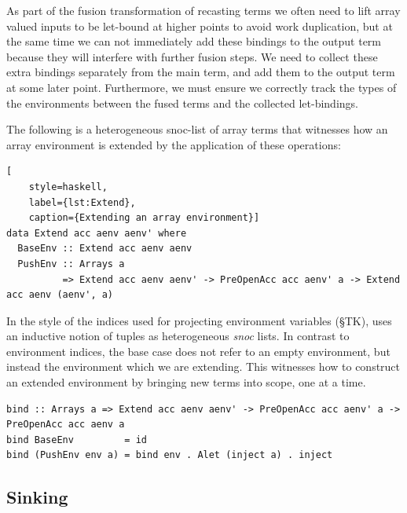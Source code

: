 As part of the fusion transformation of recasting terms we often need to lift
array valued inputs to be let-bound at higher points to avoid work duplication,
but at the same time we can not immediately add these bindings to the output
term because they will interfere with further fusion steps. We need to collect
these extra bindings separately from the main term, and add them to the output
term at some later point. Furthermore, we must ensure we correctly track the
types of the environments between the fused terms and the collected
let-bindings.

The following is a heterogeneous snoc-list of array terms that witnesses how an
array environment is extended by the application of these operations:
%
\begin{lstlisting}[
    style=haskell,
    label={lst:Extend},
    caption={Extending an array environment}]
data Extend acc aenv aenv' where
  BaseEnv :: Extend acc aenv aenv
  PushEnv :: Arrays a
          => Extend acc aenv aenv' -> PreOpenAcc acc aenv' a -> Extend acc aenv (aenv', a)
\end{lstlisting}
%
In the style of the  indices used for projecting environment
variables (\S TK),  uses an inductive notion of tuples as
heterogeneous \emph{snoc} lists. In contrast to environment indices, the base
case does not refer to an empty environment, but instead the environment
 which we are extending. This witnesses how to construct an extended
environment  by bringing new terms into scope, one at a time.
%
\begin{lstlisting}[style=haskell]
bind :: Arrays a => Extend acc aenv aenv' -> PreOpenAcc acc aenv' a -> PreOpenAcc acc aenv a
bind BaseEnv         = id
bind (PushEnv env a) = bind env . Alet (inject a) . inject
\end{lstlisting}


\subsection{Sinking}
\label{sec:sinking}

